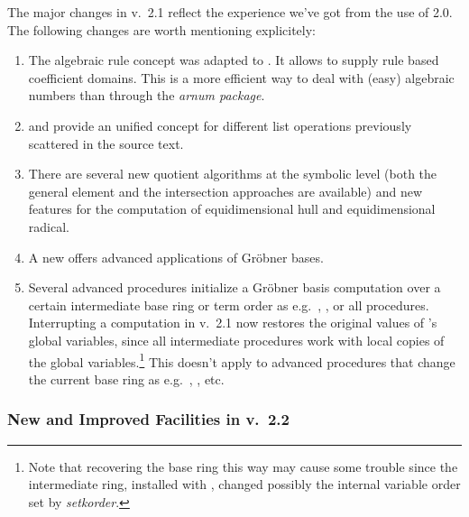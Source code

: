 The major changes in v.~2.1 reflect the experience we've got from the
use of  2.0. The following changes are worth mentioning
explicitely:
\begin{enumerate}
\item The algebraic rule concept was adapted to . It allows to
supply rule based coefficient domains. This is a more efficient way
to deal with (easy) algebraic numbers than through the \emph{arnum
package}.

\item {} and  provide an unified
concept for different list operations previously scattered in the
source text.

\item There are several new quotient algorithms at the symbolic level
(both the general element and the intersection approaches are
available) and new features for the computation of equidimensional
hull and equidimensional radical.

\item A new  offers advanced applications of Gr\"obner
bases.

\item Several advanced procedures initialize a Gr\"obner basis computation
over a certain intermediate base ring or term order as e.g.\
, ,  or all
 procedures. Interrupting a computation in
v.~2.1 now restores the original values of \package{CALI}'s global variables,
since all intermediate procedures work with local copies of
the global variables.\footnote{Note that recovering the base
ring this way may cause some trouble since the intermediate ring,
installed with \ind{setring}, changed possibly the internal variable
order set by \emph{setkorder}.} This doesn't apply to advanced
procedures that change the current base ring as e.g.\ ,
\ind{preimage}, \ind{sym} etc.

\end{enumerate}

\subsubsection{New and Improved Facilities in v.~2.2}

